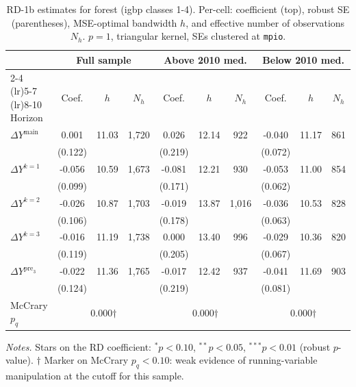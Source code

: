 \documentclass[11pt]{article}
\begin{document}
\begin{table}[H]
\centering
\scriptsize
\caption{RD-1b estimates for forest (igbp classes 1-4). Per-cell: coefficient
(top), robust SE (parentheses), MSE-optimal bandwidth $h$, and
effective number of observations $N_h$. $p=1$, triangular kernel,
SEs clustered at \texttt{mpio}.}
\label{tab:rdplot_rd1b_forest}
\begin{tabular}{l ccc ccc ccc}
\toprule
 & \multicolumn{3}{c}{Full sample} & \multicolumn{3}{c}{Above 2010 med.} & \multicolumn{3}{c}{Below 2010 med.} \\
\cmidrule(lr){2-4} \cmidrule(lr){5-7} \cmidrule(lr){8-10}
Horizon & Coef. & $h$ & $N_h$ & Coef. & $h$ & $N_h$ & Coef. & $h$ & $N_h$ \\
\midrule
$\Delta Y^{\text{main}}$ & 0.001 & 11.03 & 1,720 & 0.026 & 12.14 & 922 & -0.040 & 11.17 & 861 \\
 & (0.122) &  &  & (0.219) &  &  & (0.072) &  &  \\
\addlinespace[1pt]
$\Delta Y^{k=1}$ & -0.056 & 10.59 & 1,673 & -0.081 & 12.21 & 930 & -0.053 & 11.00 & 854 \\
 & (0.099) &  &  & (0.171) &  &  & (0.062) &  &  \\
\addlinespace[1pt]
$\Delta Y^{k=2}$ & -0.026 & 10.87 & 1,703 & -0.019 & 13.87 & 1,016 & -0.036 & 10.53 & 828 \\
 & (0.106) &  &  & (0.178) &  &  & (0.063) &  &  \\
\addlinespace[1pt]
$\Delta Y^{k=3}$ & -0.016 & 11.19 & 1,738 & 0.000 & 13.40 & 996 & -0.029 & 10.36 & 820 \\
 & (0.119) &  &  & (0.205) &  &  & (0.067) &  &  \\
\addlinespace[1pt]
$\Delta Y^{\text{pre}_3}$ & -0.022 & 11.36 & 1,765 & -0.017 & 12.42 & 937 & -0.041 & 11.69 & 903 \\
 & (0.124) &  &  & (0.219) &  &  & (0.081) &  &  \\
\addlinespace[1pt]
\midrule
McCrary $p_q$ & \multicolumn{3}{c}{0.000$\dagger$} & \multicolumn{3}{c}{0.000$\dagger$} & \multicolumn{3}{c}{0.000$\dagger$} \\
\bottomrule
\end{tabular}
\begin{flushleft}\footnotesize
\textit{Notes.} Stars on the RD coefficient: $^{*}p<0.10$,
$^{**}p<0.05$, $^{***}p<0.01$ (robust $p$-value).
$\dagger$ Marker on McCrary $p_q<0.10$: weak evidence of running-variable manipulation at the cutoff for this sample.\\
\end{flushleft}
\end{table}
\end{document}
